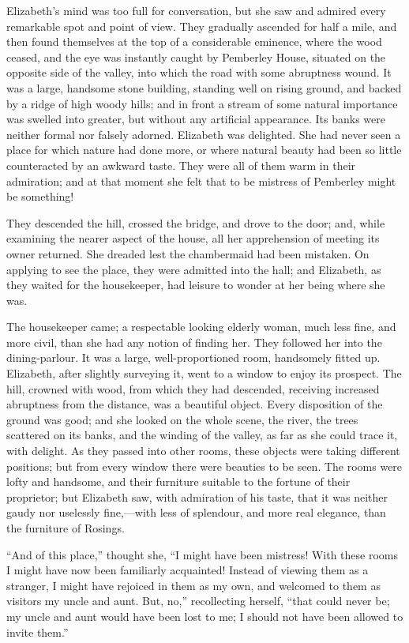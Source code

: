 Elizabeth's mind was too full for conversation, but she saw and admired every remarkable spot and point of view. They gradually ascended for half a mile, and then found themselves at the top of a considerable eminence, where the wood ceased, and the eye was instantly caught by Pemberley House, situated on the opposite side of the valley, into which the road with some abruptness wound. It was a large, handsome stone building, standing well on rising ground, and backed by a ridge of high woody hills; and in front a stream of some natural importance was swelled into greater, but without any artificial appearance. Its banks were neither formal nor falsely adorned. Elizabeth was delighted. She had never seen a place for which nature had done more, or where natural beauty had been so little counteracted by an awkward taste. They were all of them warm in their admiration; and at that moment she felt that to be mistress of Pemberley might be something!

They descended the hill, crossed the bridge, and drove to the door; and, while examining the nearer aspect of the house, all her apprehension of meeting its owner returned. She dreaded lest the chambermaid had been mistaken. On applying to see the place, they were admitted into the hall; and Elizabeth, as they waited for the housekeeper, had leisure to wonder at her being where she was.

The housekeeper came; a respectable looking elderly woman, much less fine, and more civil, than she had any notion of finding her. They followed her into the dining-parlour. It was a large, well-proportioned room, handsomely fitted up. Elizabeth, after slightly surveying it, went to a window to enjoy its prospect. The hill, crowned with wood, from which they had descended, receiving increased abruptness from the distance, was a beautiful object. Every disposition of the ground was good; and she looked on the whole scene, the river, the trees scattered on its banks, and the winding of the valley, as far as she could trace it, with delight. As they passed into other rooms, these objects were taking different positions; but from every window there were beauties to be seen. The rooms were lofty and handsome, and their furniture suitable to the fortune of their proprietor; but Elizabeth saw, with admiration of his taste, that it was neither gaudy nor uselessly fine,---with less of splendour, and more real elegance, than the furniture of Rosings.

``And of this place,'' thought she, ``I might have been mistress! With these rooms I might have now been familiarly acquainted! Instead of viewing them as a stranger, I might have rejoiced in them as my own, and welcomed to them as visitors my uncle and aunt. But, no,'' recollecting herself, ``that could never be; my uncle and aunt would have been lost to me; I should not have been allowed to invite them.''

